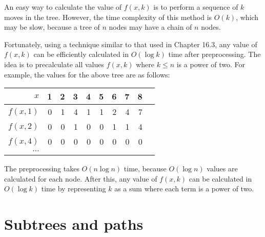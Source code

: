 An easy way to calculate the value of $f(x,k)$
is to perform a sequence of $k$ moves in the tree.
However, the time complexity of this method
is $O(k)$, which may be slow, because a tree of $n$
nodes may have a chain of $n$ nodes.

Fortunately, using a technique similar to that
used in Chapter 16.3, any value of $f(x,k)$
can be efficiently calculated in $O(\log k)$ time
after preprocessing.
The idea is to precalculate all values $f(x,k)$
where $k \le n$ is a power of two.
For example, the values for the above tree
are as follows:

\begin{center}
\begin{tabular}{r|rrrrrrrrr}
$x$ & 1 & 2 & 3 & 4 & 5 & 6 & 7 & 8 \\
\hline
$f(x,1)$ & 0 & 1 & 4 & 1 & 1 & 2 & 4 & 7 \\
$f(x,2)$ & 0 & 0 & 1 & 0 & 0 & 1 & 1 & 4 \\
$f(x,4)$ & 0 & 0 & 0 & 0 & 0 & 0 & 0 & 0 \\
$\cdots$ \\
\end{tabular}
\end{center}

The preprocessing takes $O(n \log n)$ time,
because $O(\log n)$ values are calculated for each node.
After this, any value of $f(x,k)$ can be calculated
in $O(\log k)$ time by representing $k$
as a sum where each term is a power of two.

\section{Subtrees and paths}


